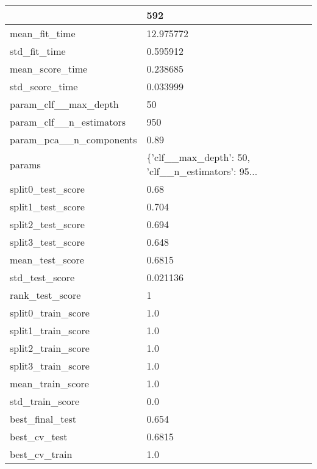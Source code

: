 \begin{tabular}{ll}
\toprule
{} &                                                592 \\
\midrule
mean\_fit\_time           &                                          12.975772 \\
std\_fit\_time            &                                           0.595912 \\
mean\_score\_time         &                                           0.238685 \\
std\_score\_time          &                                           0.033999 \\
param\_clf\_\_max\_depth    &                                                 50 \\
param\_clf\_\_n\_estimators &                                                950 \\
param\_pca\_\_n\_components &                                               0.89 \\
params                  &  \{'clf\_\_max\_depth': 50, 'clf\_\_n\_estimators': 95... \\
split0\_test\_score       &                                               0.68 \\
split1\_test\_score       &                                              0.704 \\
split2\_test\_score       &                                              0.694 \\
split3\_test\_score       &                                              0.648 \\
mean\_test\_score         &                                             0.6815 \\
std\_test\_score          &                                           0.021136 \\
rank\_test\_score         &                                                  1 \\
split0\_train\_score      &                                                1.0 \\
split1\_train\_score      &                                                1.0 \\
split2\_train\_score      &                                                1.0 \\
split3\_train\_score      &                                                1.0 \\
mean\_train\_score        &                                                1.0 \\
std\_train\_score         &                                                0.0 \\
best\_final\_test         &                                              0.654 \\
best\_cv\_test            &                                             0.6815 \\
best\_cv\_train           &                                                1.0 \\
\bottomrule
\end{tabular}
